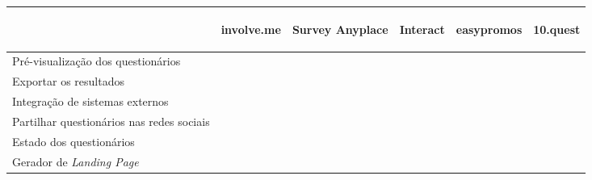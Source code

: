 \renewcommand{\arraystretch}{2}
\setlength\arrayrulewidth{1pt}
\begin{table}[!ht]  
	\begin{center}
		\begin{tabular}{|p{3cm}|p{0cm}|p{0cm}|p{0cm}|p{0cm}|p{0cm}|}
			\cline{2-6}
			\multicolumn{1}{c|}{} & \hspace{0.2cm}\begin{sideways}involve.me\end{sideways} & \hspace{0.4cm}\begin{sideways}Survey Anyplace\end{sideways} & \hspace{0.2cm}\begin{sideways}Interact\end{sideways}&
			\hspace{0.2cm}\begin{sideways}easypromos\end{sideways}&
			\hspace{0.2cm}\begin{sideways} 10.quest\end{sideways}\\ \hline
		
		
			Pré-visualização dos questionários &\cellcolor{green!80}  & \cellcolor{green!80} & \cellcolor{green!80} & \cellcolor{green!80} & \cellcolor{green!80}  \\ \hline
			
			Exportar os resultados &\cellcolor{green!80}  & \cellcolor{green!80} & \cellcolor{green!80} & \cellcolor{green!80} & \cellcolor{green!80}  \\ \hline
			
			Integração de sistemas externos & \cellcolor{green!80}  & \cellcolor{green!80} & \cellcolor{green!80} & \cellcolor{green!80} & \cellcolor{red!80}  \\ \hline
		
			Partilhar questionários nas redes sociais &\cellcolor{green!80}  & \cellcolor{yellow!80} & \cellcolor{green!80} & \cellcolor{green!80} & \cellcolor{green!80}  \\ \hline
		
			
			Estado dos questionários &\cellcolor{green!80}  & \cellcolor{red!80} & \cellcolor{red!80} & \cellcolor{green!80}  & \cellcolor{green!80}  \\ \hline
			
			Gerador de \textit{Landing Page}  &\cellcolor{red!80}  & \cellcolor{red!80} & \cellcolor{green!80} & \cellcolor{red!80}  & \cellcolor{green!80}  \\ \hline
			

\end{tabular}
\end{center}
\end{table}
